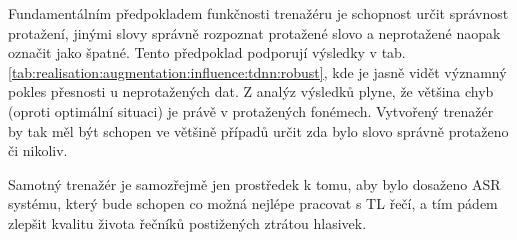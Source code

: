 Fundamentálním předpokladem funkčnosti trenažéru je schopnost určit správnost protažení, jinými slovy správně rozpoznat protažené slovo a neprotažené naopak označit jako špatné. Tento předpoklad podporují výsledky v tab. \ref{tab:realisation:augmentation:influence:tdnn:robust}, kde je jasně vidět významný pokles přesnosti u neprotažených dat. Z analýz výsledků plyne, že většina chyb (oproti optimální situaci) je právě v protažených fonémech. Vytvořený trenažér by tak měl být schopen ve většině případů určit zda bylo slovo správně protaženo či nikoliv.

Samotný trenažér je samozřejmě jen prostředek k tomu, aby bylo dosaženo ASR systému, který bude schopen co možná nejlépe pracovat s TL řečí, a tím pádem zlepšit kvalitu života řečníků postižených ztrátou hlasivek.


